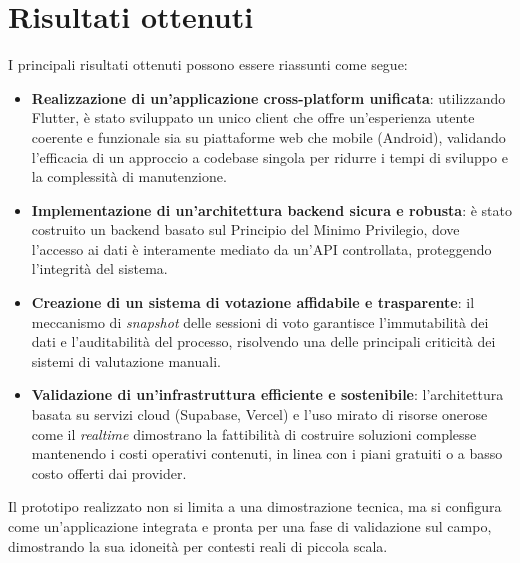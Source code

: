 \section{Risultati ottenuti}\label{sec:risultati-ottenuti}
I principali risultati ottenuti possono essere riassunti come segue:
\begin{itemize}
    \item \textbf{Realizzazione di un'applicazione cross-platform unificata}: utilizzando Flutter, è stato sviluppato un unico client che offre un'esperienza utente coerente e funzionale sia su piattaforme web che mobile (Android), validando l'efficacia di un approccio a codebase singola per ridurre i tempi di sviluppo e la complessità di manutenzione.
    \item \textbf{Implementazione di un'architettura backend sicura e robusta}: è stato costruito un backend basato sul Principio del Minimo Privilegio, dove l'accesso ai dati è interamente mediato da un'API controllata, proteggendo l'integrità del sistema.
    \item \textbf{Creazione di un sistema di votazione affidabile e trasparente}: il meccanismo di \emph{snapshot} delle sessioni di voto garantisce l'immutabilità dei dati e l'auditabilità del processo, risolvendo una delle principali criticità dei sistemi di valutazione manuali.
    \item \textbf{Validazione di un'infrastruttura efficiente e sostenibile}: l'architettura basata su servizi cloud (Supabase, Vercel) e l'uso mirato di risorse onerose come il \emph{realtime} dimostrano la fattibilità di costruire soluzioni complesse mantenendo i costi operativi contenuti, in linea con i piani gratuiti o a basso costo offerti dai provider.
\end{itemize}
Il prototipo realizzato non si limita a una dimostrazione tecnica, ma si configura come un'applicazione integrata e pronta per una fase di validazione sul campo, dimostrando la sua idoneità per contesti reali di piccola scala.


